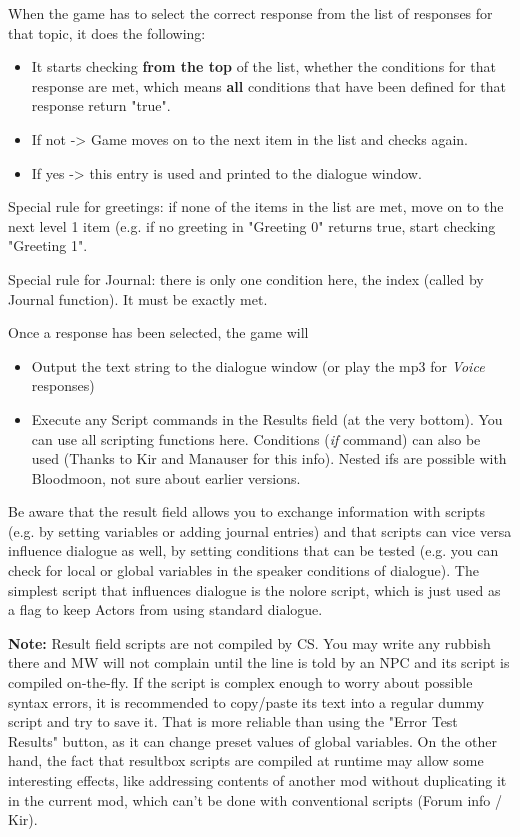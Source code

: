 \documentclass[
]{article}
\begin{document}
When the game has to select the correct response from the list of
responses for that topic, it does the following:

\begin{itemize}
\item
  It starts checking \textbf{from the top} of the list, whether the
  conditions for that response are met, which means \textbf{all}
  conditions that have been defined for that response return "true".
\item
  If not -\textgreater{} Game moves on to the next item in the list and
  checks again.
\item
  If yes -\textgreater{} this entry is used and printed to the dialogue
  window.
\end{itemize}

Special rule for greetings: if none of the items in the list are met,
move on to the next level 1 item (e.g. if no greeting in "Greeting 0"
returns true, start checking "Greeting 1".

Special rule for Journal: there is only one condition here, the index
(called by Journal function). It must be exactly met.

Once a response has been selected, the game will

\begin{itemize}
\item
  Output the text string to the dialogue window (or play the mp3 for
  \emph{Voice} responses)
\item
  Execute any Script commands in the Results field (at the very bottom).
  You can use all scripting functions here. Conditions (\emph{if}
  command) can also be used (Thanks to Kir and Manauser for this info).
  Nested ifs are possible with Bloodmoon, not sure about earlier
  versions.
\end{itemize}

Be aware that the result field allows you to exchange information with
scripts (e.g. by setting variables or adding journal entries) and that
scripts can vice versa influence dialogue as well, by setting conditions
that can be tested (e.g. you can check for local or global variables in
the speaker conditions of dialogue). The simplest script that influences
dialogue is the nolore script, which is just used as a flag to keep
Actors from using standard dialogue.

\textbf{Note:} Result field scripts are not compiled by CS. You may
write any rubbish there and MW will not complain until the line is told
by an NPC and its script is compiled on-the-fly. If the script is
complex enough to worry about possible syntax errors, it is recommended
to copy/paste its text into a regular dummy script and try to save it.
That is more reliable than using the "Error Test Results" button, as it
can change preset values of global variables. On the other hand, the
fact that resultbox scripts are compiled at runtime may allow some
interesting effects, like addressing contents of another mod without
duplicating it in the current mod, which can't be done with conventional
scripts (Forum info / Kir).
\end{document}
